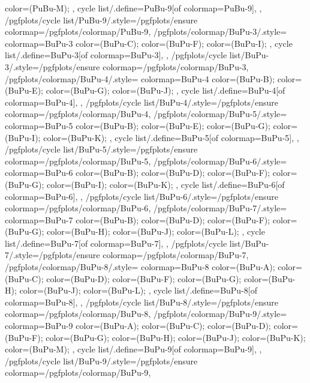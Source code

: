 {{{      color=(PuBu-M);
    },
    cycle list/.define={PuBu-9}{[of colormap=PuBu-9]},
  },
  /pgfplots/cycle list/PuBu-9/.style={/pgfplots/ensure colormap={/pgfplots/colormap/PuBu-9}},
  /pgfplots/colormap/BuPu-3/.style={
    colormap={BuPu-3}{
      color=(BuPu-C);
      color=(BuPu-F);
      color=(BuPu-I);
    },
    cycle list/.define={BuPu-3}{[of colormap=BuPu-3]},
  },
  /pgfplots/cycle list/BuPu-3/.style={/pgfplots/ensure colormap={/pgfplots/colormap/BuPu-3}},
  /pgfplots/colormap/BuPu-4/.style={
    colormap={BuPu-4}{
      color=(BuPu-B);
      color=(BuPu-E);
      color=(BuPu-G);
      color=(BuPu-J);
    },
    cycle list/.define={BuPu-4}{[of colormap=BuPu-4]},
  },
  /pgfplots/cycle list/BuPu-4/.style={/pgfplots/ensure colormap={/pgfplots/colormap/BuPu-4}},
  /pgfplots/colormap/BuPu-5/.style={
    colormap={BuPu-5}{
      color=(BuPu-B);
      color=(BuPu-E);
      color=(BuPu-G);
      color=(BuPu-I);
      color=(BuPu-K);
    },
    cycle list/.define={BuPu-5}{[of colormap=BuPu-5]},
  },
  /pgfplots/cycle list/BuPu-5/.style={/pgfplots/ensure colormap={/pgfplots/colormap/BuPu-5}},
  /pgfplots/colormap/BuPu-6/.style={
    colormap={BuPu-6}{
      color=(BuPu-B);
      color=(BuPu-D);
      color=(BuPu-F);
      color=(BuPu-G);
      color=(BuPu-I);
      color=(BuPu-K);
    },
    cycle list/.define={BuPu-6}{[of colormap=BuPu-6]},
  },
  /pgfplots/cycle list/BuPu-6/.style={/pgfplots/ensure colormap={/pgfplots/colormap/BuPu-6}},
  /pgfplots/colormap/BuPu-7/.style={
    colormap={BuPu-7}{
      color=(BuPu-B);
      color=(BuPu-D);
      color=(BuPu-F);
      color=(BuPu-G);
      color=(BuPu-H);
      color=(BuPu-J);
      color=(BuPu-L);
    },
    cycle list/.define={BuPu-7}{[of colormap=BuPu-7]},
  },
  /pgfplots/cycle list/BuPu-7/.style={/pgfplots/ensure colormap={/pgfplots/colormap/BuPu-7}},
  /pgfplots/colormap/BuPu-8/.style={
    colormap={BuPu-8}{
      color=(BuPu-A);
      color=(BuPu-C);
      color=(BuPu-D);
      color=(BuPu-F);
      color=(BuPu-G);
      color=(BuPu-H);
      color=(BuPu-J);
      color=(BuPu-L);
    },
    cycle list/.define={BuPu-8}{[of colormap=BuPu-8]},
  },
  /pgfplots/cycle list/BuPu-8/.style={/pgfplots/ensure colormap={/pgfplots/colormap/BuPu-8}},
  /pgfplots/colormap/BuPu-9/.style={
    colormap={BuPu-9}{
      color=(BuPu-A);
      color=(BuPu-C);
      color=(BuPu-D);
      color=(BuPu-F);
      color=(BuPu-G);
      color=(BuPu-H);
      color=(BuPu-J);
      color=(BuPu-K);
      color=(BuPu-M);
    },
    cycle list/.define={BuPu-9}{[of colormap=BuPu-9]},
  },
  /pgfplots/cycle list/BuPu-9/.style={/pgfplots/ensure colormap={/pgfplots/colormap/BuPu-9}},
}
